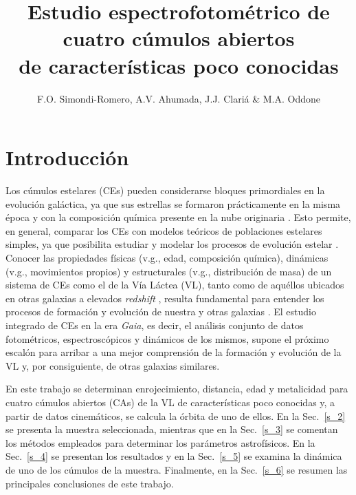 \documentclass[baaa]{baaa}
\title{Estudio espectrofotom\'etrico de cuatro c\'umulos abiertos \\de caracter\'isticas poco conocidas}
\author{F.O. Simondi-Romero\inst{1,2}, A.V. Ahumada\inst{2,3},
J.J. Clari\'a\inst{2,3}
\&
M.A. Oddone\inst{2}
}
\institute{Facultad de Matem\'atica, Astronom\'ia, F\'isica y Computaci\'on, UNC, Argentina \and Observatorio Astron\'omico de C\'ordoba, UNC, Argentina
\and
Consejo Nacional de Investigaciones Cient\'ificas y T\'ecnicas, Argentina
}
\begin{document}
\maketitle
\section{Introducci\'on}
Los c\'umulos estelares (CEs) pueden considerarse bloques primordiales en la evoluci\'on gal\'actica, ya que sus estrellas se formaron pr\'acticamente en la misma \'epoca y con la composici\'on qu\'imica presente en la nube originaria \citep{J00}. Esto permite, en general, comparar los CEs con modelos te\'oricos de poblaciones estelares simples, ya que posibilita estudiar y modelar los procesos de evoluci\'on estelar \citep{SC05}. Conocer las propiedades f\'isicas (\textrm{v.g.}, edad, composici\'on qu\'imica), din\'amicas (\textrm{v.g.}, movimientos propios) y estructurales (\textrm{v.g.}, distribuci\'on de masa) de un sistema de CEs como el de la V\'ia L\'actea (VL), tanto como de aqu\'ellos ubicados en otras galaxias a elevados {\em redshift} \citep{BL24}, resulta fundamental para entender los procesos de formaci\'on y evoluci\'on de nuestra y otras galaxias \citep{GR11}. El estudio integrado de CEs en la era {\sl Gaia}, es decir, el an\'alisis conjunto de datos fotom\'etricos, espectrosc\'opicos y din\'amicos de los mismos, supone el pr\'oximo escal\'on para arribar a una mejor comprensi\'on de la formaci\'on y evoluci\'on de la VL y, por consiguiente, de otras galaxias similares.

En este trabajo se determinan enrojecimiento, distancia, edad y metalicidad para cuatro c\'umulos abiertos (CAs) de la VL de caracter\'isticas poco conocidas y, a partir de datos cinem\'aticos, se calcula la \'orbita de uno de ellos. En la Sec.~\ref{s_2} se presenta la muestra seleccionada, mientras que en la Sec.~\ref{s_3} se comentan los m\'etodos empleados para determinar los par\'ametros astrof\'isicos. En la Sec.~\ref{s_4} se presentan los resultados y en la Sec.~\ref{s_5} se examina la din\'amica de uno de los c\'umulos de la muestra. Finalmente, en la Sec.~\ref{s_6} se resumen las principales conclusiones de este trabajo.
\end{document}
